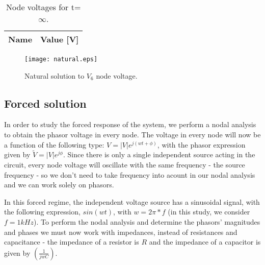 \begin{table}[h]
  \centering
  \begin{tabular}{|l|r|}
    \hline    
    {\bf Name} & {\bf Value [V]} \\ \hline
     
  \end{tabular}
  \caption{Node voltages for t=$\infty$.}
  \label{tab:nule}
\end{table}

\begin{figure}[h] \centering
\texttt{[image: natural.eps]}
\caption{Natural solution to $V_{6}$ node voltage.}
\label{fig:current}
\end{figure}

\subsection{Forced solution}
In order to study the forced response of the system, we perform a nodal analysis to obtain the phasor voltage in every node. The voltage in every node will now be a function of the following type: $V = |V|e^{j(wt+\phi)}$, with the phasor expression given by $\tilde{V} = |V|e^{j\phi}$. Since there is only a single independent source acting in the circuit, every node voltage will oscillate with the same frequency - the source frequency - so we don't need to take frequency into acount in our nodal analysis and we can work solely on phasors. 

In this forced regime, the independent voltage source has a sinusoidal signal, with the following expression, $sin(wt)$, with $w=2\pi*f$ (in this study, we consider $f = 1kHz$). To perform the nodal analysis and determine the phasors' magnitudes and phases we must now work with impedances, instead of resistances and capacitance - the impedance of a resistor is $R$ and the impedance of a capacitor is given by $(\frac{1}{jwC})$. 

